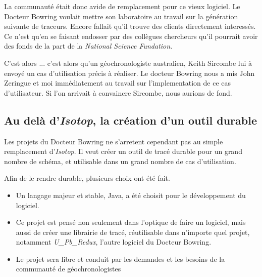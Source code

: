 La communauté était donc avide de remplacement pour ce vieux logiciel. Le Docteur Bowring voulait mettre son laboratoire au travail sur la génération suivante de traceurs. Encore fallait qu'il trouve des clients directement interessés. Ce n'est qu'en se faisant endosser par des collègues chercheurs qu'il pourrait avoir des fonds de la part de la \textit{National Science Fundation}.

C'est alors ... c'est alors qu'un géochronologiste australien, Keith Sircombe lui à envoyé un cas d'utilisation précis à réaliser. Le docteur Bowring nous a mis John Zeringue et moi immédiatement au travail sur l'implementation de ce cas d'utilisateur. Si l'on arrivait à convaincre Sircombe, nous aurions de fond.

\subsection{Au delà d'\textit{Isotop}, la création d'un outil durable}
Les projets du Docteur Bowring ne s'arretent cependant pas au simple remplacement d'\textit{Isotop}. Il veut créer un outil de tracé durable pour un grand nombre de schéma, et utilisable dans un grand nombre de cas d'utilisation.

Afin de le rendre durable, plusieurs choix ont été fait. 
\begin{itemize}
\item Un langage majeur et stable, Java, a été choisit pour le développement du logiciel.
\item Ce projet est pensé non seulement dans l'optique de faire un logiciel, mais aussi de créer une librairie de tracé, réutilisable dans n'importe quel projet, notamment \textit{U\_Pb\_Redux}, l'autre logiciel du Docteur Bowring.
\item Le projet sera libre et conduit par les demandes et les besoins de la communauté de géochronologistes
\end{itemize}
